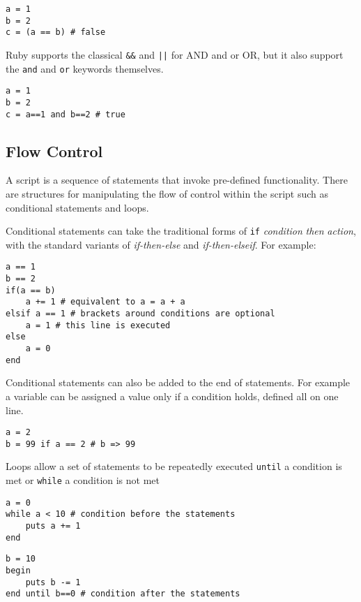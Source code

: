 \begin{bibunit}
\begin{lstlisting}
a = 1
b = 2
c = (a == b) # false
\end{lstlisting}

Ruby supports the classical \texttt{\&\&} and \texttt{||} for AND and or OR, but it also support the \texttt{and} and \texttt{or} keywords themselves.

\begin{lstlisting}
a = 1
b = 2
c = a==1 and b==2 # true
\end{lstlisting}

\subsection{Flow Control}
A script is a sequence of statements that invoke pre-defined functionality. There are structures for manipulating the flow of control within the script such as conditional statements and loops.

Conditional statements can take the traditional forms of \texttt{if} \emph{condition} \emph{then} \emph{action}, with the standard variants of \emph{if-then-else} and \emph{if-then-elseif}. For example:

\begin{lstlisting}
a == 1
b == 2
if(a == b) 
	a += 1 # equivalent to a = a + a
elsif a == 1 # brackets around conditions are optional
	a = 1 # this line is executed
else 
 	a = 0
end
\end{lstlisting}

Conditional statements can also be added to the end of statements. For example a variable can be assigned a value only if a condition holds, defined all on one line.

\begin{lstlisting}
a = 2
b = 99 if a == 2 # b => 99
\end{lstlisting}

Loops allow a set of statements to be repeatedly executed \texttt{until} a condition is met or \texttt{while} a condition is not met

\begin{lstlisting}
a = 0
while a < 10 # condition before the statements
	puts a += 1
end
\end{lstlisting}

\begin{lstlisting}
b = 10
begin 
	puts b -= 1
end until b==0 # condition after the statements
\end{lstlisting}


\end{bibunit}

